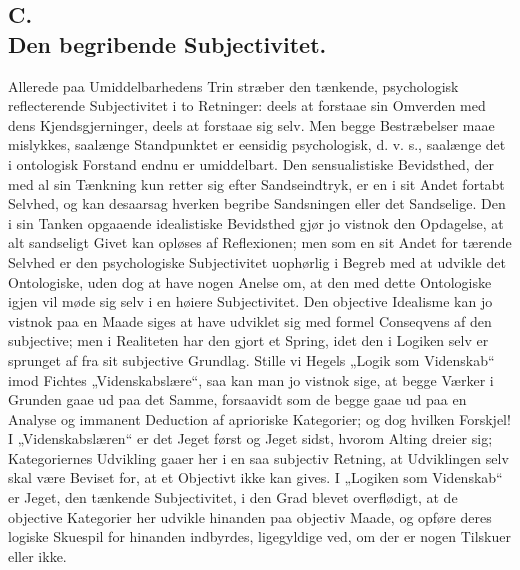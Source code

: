 \documentclass[11pt]{book}
\newcommand{\opage}[1]{\marginnote{\footnotesize\textit{[#1]}}}
\begin{document}
\subsection*{C.\\ Den begribende Subjectivitet.}

Allerede paa Umiddelbarhedens Trin stræber den tænkende, psychologisk
reflecterende Subjectivitet i to Retninger: deels at forstaae sin Omverden
med dens Kjendsgjerninger, deels at forstaae sig selv. Men begge
Bestræbelser maae mislykkes, saalænge Standpunktet er eensidig
psychologisk, d. v. s., saalænge det i ontologisk Forstand endnu er
umiddelbart. Den sensualistiske Bevidsthed, der med al sin Tænkning kun
retter sig efter Sandseindtryk, er en i sit Andet fortabt Selvhed, og kan
desaarsag hverken begribe Sandsningen eller det Sandselige. Den i sin
Tanken opgaaende idealistiske Bevidsthed gjør jo vistnok den Opdagelse,
at alt sandseligt Givet kan opløses af Reflexionen; men som en sit Andet
for\-%
\opage{134} \setcounter{footnote}{0}%
tærende Selvhed er den psychologiske Subjectivitet uophørlig i Begreb med
at udvikle det Ontologiske, uden dog at have nogen Anelse om, at den med
dette Ontologiske igjen vil møde sig selv i en høiere Subjectivitet. Den
objective Idealisme kan jo vistnok paa en Maade siges at have udviklet sig
med formel Conseqvens af den subjective; men i Realiteten har den gjort et
Spring, idet den i Logiken selv er sprunget af fra sit subjective Grundlag.
Stille vi Hegels „Logik som Videnskab“ imod Fichtes „Videnskabslære“, saa
kan man jo vistnok sige, at begge Værker i Grunden gaae ud paa det Samme,
forsaavidt som de begge gaae ud paa en Analyse og immanent Deduction af
aprioriske Kategorier; og dog hvilken Forskjel! I „Videnskabslæren“ er det
Jeget først og Jeget sidst, hvorom Alting dreier sig; Kategoriernes
Udvikling gaaer her i en saa subjectiv Retning, at Udviklingen selv skal
være Beviset for, at et Objectivt ikke kan gives. I „Logiken som
Videnskab“ er Jeget, den tænkende Subjectivitet, i den Grad blevet
overflødigt, at de objective Kategorier her udvikle hinanden paa objectiv
Maade, og opføre deres logiske Skuespil for hinanden indbyrdes,
ligegyldige ved, om der er nogen Tilskuer eller ikke.
\end{document}
